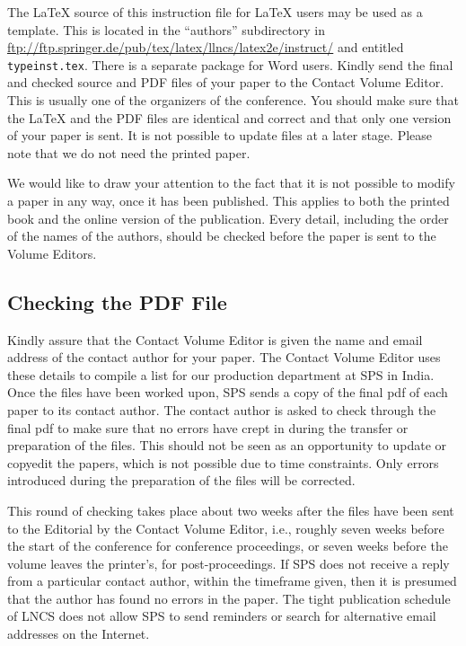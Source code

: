 \documentclass[runningheads,a4paper]{llncs}
\begin{document}
The \LaTeX{} source of this instruction file for \LaTeX{} users may be
used as a template. This is
located in the ``authors'' subdirectory in
\url{ftp://ftp.springer.de/pub/tex/latex/llncs/latex2e/instruct/} and
entitled \texttt{typeinst.tex}. There is a separate package for Word 
users. Kindly send the final and checked source
and PDF files of your paper to the Contact Volume Editor. This is
usually one of the organizers of the conference. You should make sure
that the \LaTeX{} and the PDF files are identical and correct and that
only one version of your paper is sent. It is not possible to update
files at a later stage. Please note that we do not need the printed
paper.

We would like to draw your attention to the fact that it is not possible
to modify a paper in any way, once it has been published. This applies
to both the printed book and the online version of the publication.
Every detail, including the order of the names of the authors, should
be checked before the paper is sent to the Volume Editors.

\subsection{Checking the PDF File}

Kindly assure that the Contact Volume Editor is given the name and email
address of the contact author for your paper. The Contact Volume Editor
uses these details to compile a list for our production department at
SPS in India. Once the files have been worked upon, SPS sends a copy of
the final pdf of each paper to its contact author. The contact author is
asked to check through the final pdf to make sure that no errors have
crept in during the transfer or preparation of the files. This should
not be seen as an opportunity to update or copyedit the papers, which is
not possible due to time constraints. Only errors introduced during the
preparation of the files will be corrected.

This round of checking takes place about two weeks after the files have
been sent to the Editorial by the Contact Volume Editor, i.e., roughly
seven weeks before the start of the conference for conference
proceedings, or seven weeks before the volume leaves the printer's, for
post-proceedings. If SPS does not receive a reply from a particular
contact author, within the timeframe given, then it is presumed that the
author has found no errors in the paper. The tight publication schedule
of LNCS does not allow SPS to send reminders or search for alternative
email addresses on the Internet.
\end{document}
